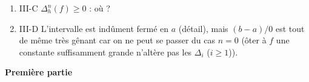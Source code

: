 \documentclass[a4paper]{article}
\begin{document}
\begin{enumerate}
\begin{enumerate}
	\item

	III-C $\Delta_h^n(f)\ge 0$ : o\`u ?

	\item
	
	III-D L'intervalle est ind\^ument ferm\'e en $a$ (d\'etail), mais
$(b-a)/0$ est tout de m\^eme tr\`es g\^enant car on ne peut se passer du cas
$n=0$ (\^oter \`a $f$ une constante suffisamment grande n'alt\`ere pas les
$\Delta_i$ ($i\ge1$)).
 	
	\end{enumerate}

\end{enumerate}



\vspace*{3em}
\centerline{\textbf{\Large Premi\`ere partie}}
\end{document}
